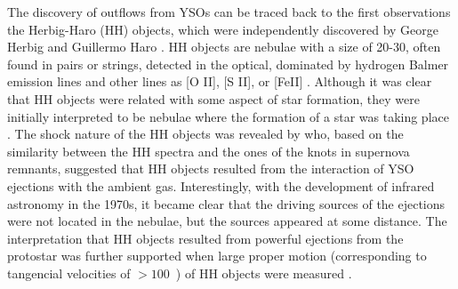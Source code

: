 \documentclass[12pt]{mythesis}
\begin{document}
The discovery of outflows from YSOs
can be traced back to the first observations the Herbig-Haro (HH) objects, which were independently discovered by George Herbig \citep{herbig1951, herbig1952} and Guillermo Haro \citep{haro1952}.
HH objects are nebulae with a size of 20-30\arcsec, often found in pairs or strings, detected in the optical, dominated by hydrogen Balmer emission lines and other lines as [O II], [S II], or [FeII] \citep{schwartz1983, reipurth1997, reipurth2001}. Although it was clear that HH objects were related with some aspect of star formation, they were initially interpreted to be nebulae where the formation of a star was taking place \citep{herbig1969}.
The shock nature of the HH objects was revealed by \citet{schwartz1975} who, based on the similarity between the HH spectra and the ones of the knots in supernova remnants, suggested that HH objects resulted from the interaction of YSO ejections with the ambient gas. Interestingly, with the development of infrared astronomy in the 1970s, it became clear that the driving sources of the ejections were not located in the nebulae, but the sources appeared at some distance.
The interpretation that HH objects resulted from powerful ejections from the protostar was further supported
when large proper motion (corresponding to tangencial velocities of $>100$~\kms) of HH objects were measured \citep{cudworth1979,herbig1981, jones1983}.
\end{document}
